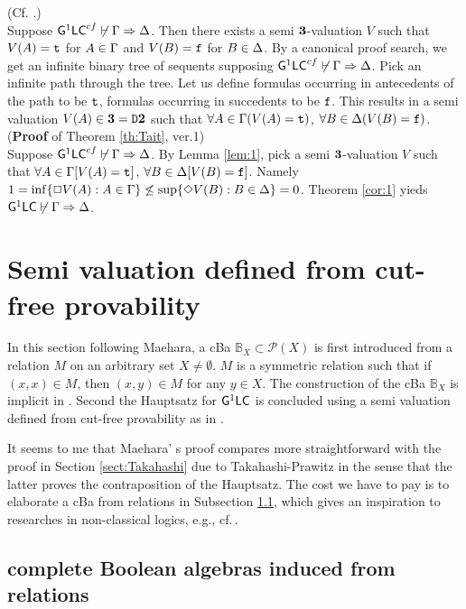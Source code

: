 \documentclass{article}
\newcommand{\bfthree}{\mbox{\boldmath$3$}}
\begin{document}
\blem\label{lem:1}{\rm (Cf. \cite{Schuette60}.)}\\
Suppose ${\sf G}^{1}{\sf LC}^{cf}\not\vdash\Gamma\Rightarrow\Delta$.
Then there exists a semi $\bfthree$-valuation $V$ such that
$V(A)={\tt t}$ for $A\in\Gamma$ and $V(B)={\tt f}$ for $B\in\Delta$.
\elem
\bprf
By a canonical proof search,  we get an infinite binary tree of sequents supposing
 ${\sf G}^{1}{\sf LC}^{cf}\not\vdash\Gamma\Rightarrow\Delta$.
Pick an infinite path through the tree.
Let us define formulas occurring in antecedents of the path to be ${\tt t}$,
formulas occurring in succedents to be ${\tt f}$.
This results in a semi valuation $V(A)\in\bfthree={\tt D}\bftwo$ such that
$\forall A\in\Gamma(V(A)={\tt t})$, $\forall B\in\Delta(V(B)={\tt f})$.
\eprf
\\

\noindent
({\bf Proof} of Theorem \ref{th:Tait}, ver.1)
\\
Suppose ${\sf G}^{1}{\sf LC}^{cf}\not\vdash\Gamma\Rightarrow\Delta$.
By Lemma \ref{lem:1}, pick a semi $\bfthree$-valuation $V$ such that
$\forall A\in\Gamma[V(A)={\tt t}]$, $\forall B\in\Delta[V(B)={\tt f}]$.
Namely
$1=\inf\{\Box V(A):A\in\Gamma\}\not\leq\sup\{\Diamond V(B): B\in\Delta\}=0$.
Theorem \ref{cor:1} yieds
 ${\sf G}^{1}{\sf LC}\not\vdash\Gamma\Rightarrow\Delta$.
\eprf

\section{Semi valuation defined from cut-free provability}\label{sect:Maehara}
In this section following Maehara\cite{Maehara},
 a cBa $\mathbb{B}_{X}\subset\mathcal{P}(X)$ is first introduced from a relation $M$ on an arbitrary set $X\neq\emptyset$.
 $M$ is a symmetric relation such that if $(x,x)\in M$, then $(x,y)\in M$ for any $y\in X$.
 The construction of the cBa $\mathbb{B}_{X}$ is implicit in \cite{Maehara}.
 Second the Hauptsatz for ${\sf G}^{1}{\sf LC}$ is concluded using a semi valuation defined from cut-free
 provability as in \cite{Maehara}.
 
It seems to me that 
Maehara' s proof compares more straightforward with the proof in Section \ref{sect:Takahashi} due to Takahashi-Prawitz
in the sense that the latter proves the contraposition of the Hauptsatz.
The cost we have to pay is to elaborate a cBa from relations in Subsection \ref{subsec:cBa},
which gives an inspiration to researches in non-classical logics, e.g., cf.\,\cite{BJOno}.
 
 
\subsection{complete Boolean algebras induced from relations}\label{subsec:cBa}
\end{document}
